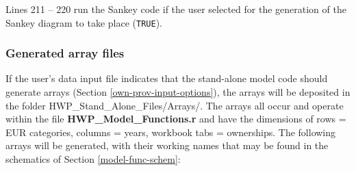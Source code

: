 \documentclass[
  openany]{book}
\begin{document}
Lines 211 -- 220 run the Sankey code if the user selected for the generation of the Sankey diagram to take place (\texttt{TRUE}).

\hypertarget{dnld-sa-arrays}{%
\subsubsection{Generated array files}\label{dnld-sa-arrays}}

If the user's data input file indicates that the stand-alone model code should generate arrays (Section \ref{own-prov-input-options}), the arrays will be deposited in the folder HWP\_Stand\_Alone\_Files/Arrays/. The arrays all occur and operate within the file \textbf{HWP\_Model\_Functions.r} and have the dimensions of rows = EUR categories, columns = years, workbook tabs = ownerships. The following arrays will be generated, with their working names that may be found in the schematics of Section \ref{model-func-schem}:
\end{document}
